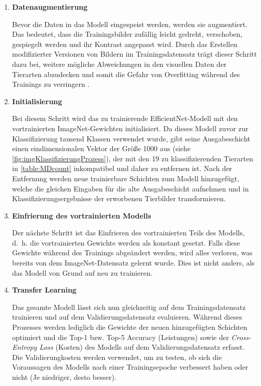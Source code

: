 \begin{enumerate}
	\item \textbf{Datenaugmentierung}
	
	Bevor die Daten in das Modell eingespeist werden, werden sie augmentiert. Das bedeutet, dass die Trainingsbilder zufällig leicht gedreht, verschoben, gespiegelt werden und ihr Kontrast angepasst wird. Durch das Erstellen modifizierter Versionen von Bildern im Trainingsdatensatz trägt dieser Schritt dazu bei, weitere mögliche Abweichungen in den visuellen Daten der Tierarten abzudecken und somit die Gefahr von Overfitting während des Trainings zu verringern \cite{Shorten2019}.
	
	\item \textbf{Initialisierung}
	
	Bei diesem Schritt wird das zu trainierende EfficientNet-Modell mit den vortrainierten ImageNet-Gewichten initialisiert. Da dieses Modell zuvor zur Klassifizierung tausend Klassen verwendet wurde, gibt seine Ausgabeschicht einen eindimensionalen Vektor der Größe 1000 aus (siehe \autoref{fig:imgKlassifizierungProzess}), der mit den 19 zu klassifizierenden Tierarten in \autoref{table:MDcount} inkompatibel und daher zu entfernen ist. Nach der Entfernung werden neue trainierbare Schichten zum Modell hinzugefügt, welche die gleichen Eingaben für die alte Ausgabeschicht aufnehmen und in Klassifizierungsergebnisse der erworbenen Tierbilder transformieren.
	
	\item \textbf{Einfrierung des vortrainierten Modells}
	
	Der nächste Schritt ist das Einfrieren des vortrainierten Teils des Modells, d.~h. die vortrainierten Gewichte werden als konstant gesetzt. Falls diese Gewichte während des Trainings abgeändert werden, wird alles verloren, was bereits von dem ImageNet-Datensatz gelernt wurde. Dies ist nicht anders, als das Modell von Grund auf neu zu trainieren.
	
	\item \textbf{Transfer Learning}
	
	Das gesamte Modell lässt sich nun gleichzeitig auf dem Trainingsdatensatz trainieren und auf dem Validierungsdatensatz evaluieren. Während dieses Prozesses werden lediglich die Gewichte der neuen hinzugefügten Schichten optimiert und die Top-1 bzw. Top-5 Accuracy (Leistungen) sowie der \emph{Cross-Entropy Loss} (Kosten) des Modells auf dem Validierungsdatensatz erfasst. Die Validierungkosten werden verwendet, um zu testen, ob sich die Voraussagen des Modells nach einer Trainingsepoche verbessert haben oder nicht (Je niedriger, desto besser).
	

\end{enumerate}
